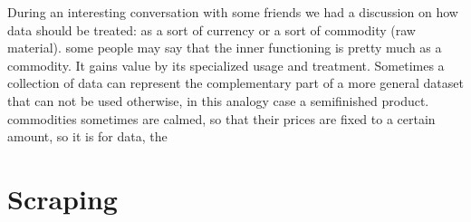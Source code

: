 \documentclass[
  12pt,
  a4paper,
]{book}
\begin{document}
During an interesting conversation with some friends we had a discussion on how data should be treated: as a sort of currency or a sort of commodity (raw material).
some people may say that the inner functioning is pretty much as a commodity. It gains value by its specialized usage and treatment. Sometimes a collection of data can represent the complementary part of a more general dataset that can not be used otherwise, in this analogy case a semifinished product. commodities sometimes are calmed, so that their prices are fixed to a certain amount, so it is for data, the

\hypertarget{scraping}{%
\chapter{Scraping}\label{scraping}}

\citep{lovelace_geocomputation_2019, R-rvest}
\end{document}
